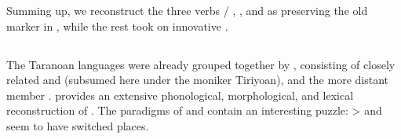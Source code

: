 Summing up, we reconstruct the three verbs / ,  , and   as preserving the old  marker  in \PWai, while the rest took on innovative .

\subsection{\PTir {}}
\label{sec:taranoan}
The Taranoan languages were already grouped together by \textcite{girard1971proto}, consisting of closely related \trio and \akuriyo (subsumed here under the moniker Tiriyoan), and the more distant member \carijo.
\textcite{meira1998proto} provides an extensive phonological, morphological, and lexical reconstruction of \PTar.
The \setone paradigms of \trio and \akuriyo contain an interesting puzzle: \PC {}>  and   seem to have switched places.
%

